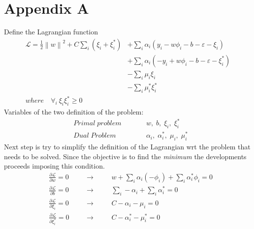 \documentclass[12pt]{article}
\newcommand{\norm}[1]{\left\lVert#1\right\rVert}
\newcommand{\Lagr}{\mathcal{L}}
\begin{document}
    \section{Appendix A} \label{appendixA}
    Define the Lagrangian function
    \begin{equation}\label{eq:APP1}
        \begin{aligned}
            \Lagr = \frac{1}{2} \norm{w}^2 + C \sum_i (\xi_i + \xi_i^*) &+\sum_i \alpha_i (y_i - w\phi_i -b - \varepsilon - \xi_i) \\
            &+\sum_i \alpha_i (-y_i + w\phi_i -b - \varepsilon - \xi_i^*) \\
            &-\sum_i \mu_i\xi_i \\
            &-\sum_i \mu_i^*\xi_i^* \\
            where \quad \forall_i \: \xi_i\xi_i^* \geq 0
        \end{aligned}
    \end{equation}
    Variables of the two definition of the problem:
    \begin{equation*}
        \begin{aligned}
                &Primal \; problem \qquad && w, \; b, \; \xi_i, \; \xi_i^* \\
                &Dual \; Problem && \alpha_i, \; \alpha_i^*, \; \mu_i, \; \mu_i^*
        \end{aligned}
    \end{equation*}
    Next step is try to simplify the definition of the Lagrangian wrt the problem that needs to be solved. Since the objective is to find the \textit{minimum} the developments proceeds imposing this condition.
    \begin{subequations}
        \begin{align}
            &\frac {\partial \Lagr}{\partial w} = 0 \quad &&\longrightarrow \quad && w + \sum_i \alpha_i(-\phi_i) + \sum_i \alpha_i^*\phi_i = 0 \label{eq:APP2a}\\
            &\frac {\partial \Lagr}{\partial b} = 0 &&\longrightarrow && \sum_i -\alpha_i + \sum_i \alpha_i^* = 0 \label{eq:APP2b}\\
            &\frac {\partial \Lagr}{\partial \xi_i} = 0 &&\longrightarrow && C - \alpha_i - \mu_i = 0 \label{eq:APP2c}\\
            &\frac {\partial \Lagr}{\partial \xi_i^*} = 0 &&\longrightarrow && C - \alpha_i^* - \mu_i^* = 0 \label{eq:APP2d}
        \end{align}
    \end{subequations}
\end{document}

